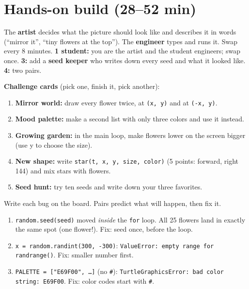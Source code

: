 \section{Hands-on build (28--52 min)}
\begin{pairroles}
The \textbf{artist} decides what the picture should look like and describes it in words
(\enquote{mirror it}, \enquote{tiny flowers at the top}). The \textbf{engineer} types and runs it.
Swap every 8 minutes. \textbf{1 student:} you are the artist and the student engineers; swap once.
\textbf{3:} add a \textbf{seed keeper} who writes down every seed and what it looked like. \textbf{4:} two pairs.
\end{pairroles}

\textbf{Challenge cards} (pick one, finish it, pick another):
\begin{enumerate}
  \item \textbf{Mirror world:} draw every flower twice, at \texttt{(x, y)} and at \texttt{(-x, y)}.
  \item \textbf{Mood palette:} make a second list with only three colors and use it instead.
  \item \textbf{Growing garden:} in the main loop, make flowers lower on the screen bigger (use y to choose the size).
  \item \textbf{New shape:} write \texttt{star(t, x, y, size, color)} (5 points: forward, right 144) and mix stars with flowers.
  \item \textbf{Seed hunt:} try ten seeds and write down your three favorites.
\end{enumerate}

\begin{bughunt}
Write each bug on the board. Pairs predict what will happen, then fix it.
\begin{enumerate}
  \item \texttt{random.seed(seed)} moved \emph{inside} the \texttt{for} loop. All 25 flowers land in exactly the same spot (one flower!). Fix: seed once, before the loop.
  \item \texttt{x = random.randint(300, -300)}: \texttt{ValueError: empty range for randrange()}. Fix: smaller number first.
  \item \texttt{PALETTE = ["E69F00", …]} (no \texttt{\#}): \texttt{TurtleGraphicsError: bad color string: E69F00}. Fix: color codes start with \texttt{\#}.
\end{enumerate}
\end{bughunt}

